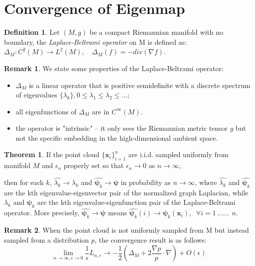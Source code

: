 \documentclass[11pt]{article}
\theoremstyle{definition}
\newtheorem{definition}{Definition}
\newtheorem{remark}{Remark}
\newtheorem{theorem}{Theorem}
\begin{document}
\section{Convergence of Eigenmap}
\begin{definition}
Let $(M, g)$ be a compact Riemannian manifold with no boundary, the \textit{Laplace-Beltrami operator} on M is defined as: $\Delta_M: C^2(M) \rightarrow L^2(M),\quad \Delta_M(f) = -div(\nabla f)$.
\end{definition}
\begin{remark}
We state some properties of the Laplace-Beltrami operator:
\begin{itemize}
\item $\Delta_M$ is a linear operator that is positive semidefinite with a discrete spectrum of eigenvalues $\{\lambda_k\}, 0 \leq \lambda_1 \leq \lambda_2 \leq ... $;
\item all eigenfunctions of $\Delta_M$ are in $C^\infty(M)$.
\item the operator is "intrinsic" -- it only sees the Riemannian metric tensor $g$ but not the specific embedding in the high-dimensional ambient space.
\end{itemize}
\end{remark}
\begin{theorem}\cite{belkin2007convergence}
If the point cloud $\{\mathbf{x}_i\}_{i=1}^n$ are i.i.d. sampled uniformly from manifold $M$ and $\epsilon_n$ properly set so that $\epsilon_n \to 0$ as $n \to \infty$,

\medskip
then for each $k$,
$\widehat{\lambda_{k}} \rightarrow \lambda_{k}$ and $\widehat{\boldsymbol{\psi}_k} \rightarrow \boldsymbol{\psi}$ in probability as $n \to \infty$, where $\widehat{\lambda_{k}}$ and $\widehat{\boldsymbol{\psi}_k}$ are the kth eigenvalue-eigenvector pair of the normalized graph Laplacian, while $\lambda_{k}$ and $\boldsymbol{\psi}_k$ are the kth eigenvalue-eigenfunction pair of the Laplace-Beltrami operator. More precisely, $\widehat{\boldsymbol{\psi}_k} \rightarrow \boldsymbol{\psi}$ means $\widehat{\boldsymbol{\psi}_k}(i) \rightarrow \boldsymbol{\psi}_k(\boldsymbol{x}_i), \;\; \forall i=1 \; ,...,\; n$.
\end{theorem}
\begin{remark}
When the point cloud is not uniformly sampled from M but instead sampled from a distribution $p$, the convergence result is as follows:
\begin{equation}
\lim_{n\rightarrow \infty, \epsilon \rightarrow 0} \frac{1}{\epsilon} L_{n,\epsilon} \to -\frac{1}{2}(\Delta_M + 2\frac{\nabla p}{p} \cdot \nabla) + O(\epsilon)
\end{equation}
\end{remark}
\end{document}

